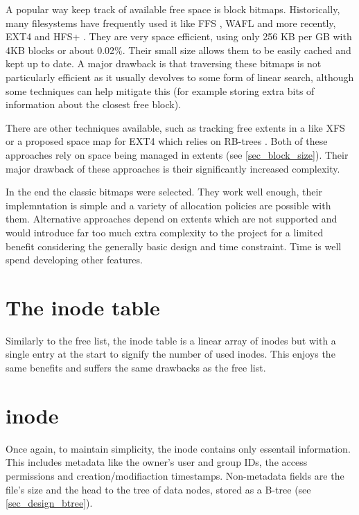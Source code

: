         A popular way keep track of available free space is block bitmaps.
        Historically, many filesystems have frequently used it like FFS
        \cite{FFS}, WAFL \cite{WALF} and more recently, EXT4
        \cite{ext4_space_maps} and HFS+
        \cite{https://developer.apple.com/library/archive/technotes/tn/tn1150.html}.
        They are very space efficient, using only 256 KB per GB with 4KB blocks
        or about 0.02\%. Their small size allows them to be easily cached and
        kept up to date. A major drawback is that traversing these bitmaps is
        not particularly efficient as it usually devolves to some form of
        linear search, although some techniques can help mitigate this (for
        example storing extra bits of information about the closest free
        block).

        There are other techniques available, such as tracking free extents in
        a \bplustree like XFS \cite{XFS} or a proposed space map for EXT4 which
        relies on RB-trees \cite{ext4_space_maps}. Both of these approaches
        rely on space being managed in extents (see \ref{sec_block_size}).
        Their major drawback of these approaches is their significantly
        increased complexity.

        In the end the classic bitmaps were selected. They work well enough,
        their implemntation is simple and a variety of allocation policies are
        possible with them. Alternative approaches depend on extents which are
        not supported and would introduce far too much extra complexity to the
        project for a limited benefit considering the generally basic design
        and time constraint. Time is well spend developing other features.

    \section{The inode table}

        Similarly to the free list, the inode table is a linear array of inodes
        but with a single entry at the start to signify the number of used
        inodes. This enjoys the same benefits and suffers the same drawbacks as
        the free list.

    \section{inode}

        Once again, to maintain simplicity, the inode contains only essentail
        information. This includes metadata like the owner's user and group
        IDs, the access permissions and creation/modifiaction timestamps.
        Non-metadata fields are the file's size and the head to the tree of
        data nodes, stored as a B-tree (see \ref{sec_design_btree}).

